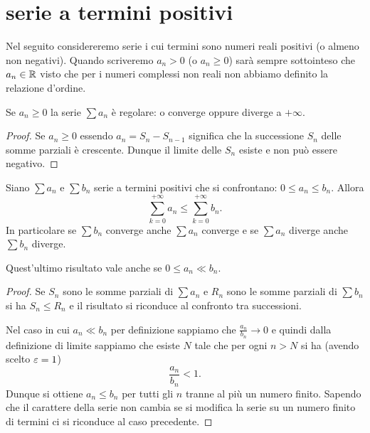 \section{serie a termini positivi}

Nel seguito considereremo serie i cui termini sono numeri reali
positivi (o almeno non negativi).
Quando scriveremo $a_n >0$ (o $a_n \ge 0$) sarà sempre
sottointeso che $a_n\in {\mathbb R}$ visto che per i numeri complessi non
reali non abbiamo definito la relazione d'ordine.

\begin{theorem}\label{th:serie_positiva}
\mymark{***}%
%
%
Se $a_n\ge 0$
la serie $\sum a_n$ è regolare:
o converge oppure diverge a $+\infty$.
\end{theorem}
%
\begin{proof}
\mymark{***}
Se $a_n \ge 0$ essendo $a_n = S_n - S_{n-1}$ significa che
la successione $S_n$ delle somme parziali è crescente.
Dunque il limite delle $S_n$ esiste e non può essere negativo.
\end{proof}

\begin{theorem}
\mymark{**}
Siano $\sum a_n$ e $\sum b_n$ serie a
termini positivi che si confrontano: $0\le a_n\le b_n$.
Allora
\[
  \sum_{k=0}^{+\infty} a_n \le \sum_{k=0}^{+\infty} b_n.
\]
In particolare se $\sum b_n$ converge anche $\sum a_n$ converge
e se $\sum a_n$ diverge anche $\sum b_n$ diverge.

Quest'ultimo risultato vale anche se $0 \le a_n \ll b_n$.
\end{theorem}
%
\begin{proof}
\mymark{*}
Se $S_n$ sono le somme parziali di $\sum a_n$ e $R_n$ sono le somme
parziali di $\sum b_n$ si ha $S_n \le R_n$ e il risultato
si riconduce al confronto tra successioni.

Nel caso in cui $a_n \ll b_n$ per definizione sappiamo che $\frac{a_n}{b_n}\to 0$
e quindi dalla definizione di limite sappiamo che
esiste $N$ tale che per ogni $n>N$ si ha (avendo scelto $\varepsilon=1$)
\[
  \frac{a_n}{b_n} < 1.
\]
Dunque si ottiene $a_n \le b_n$ per tutti gli $n$ tranne al più un numero
finito. Sapendo che il carattere della serie non cambia se si modifica
la serie su un numero finito di termini ci si riconduce al caso precedente.
\end{proof}

